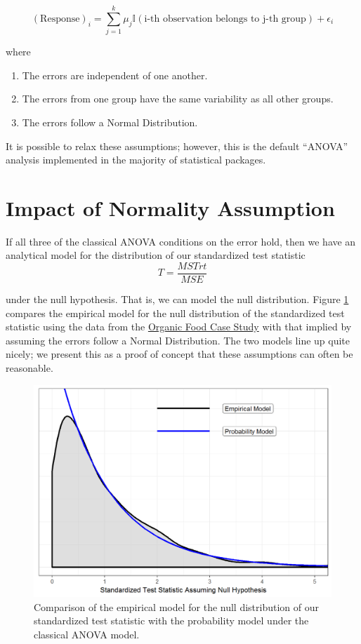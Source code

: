 \documentclass[]{book}
\providecommand{\tightlist}{%
  \setlength{\itemsep}{0pt}\setlength{\parskip}{0pt}}
\theoremstyle{definition}
\theoremstyle{definition}
\theoremstyle{definition}
\theoremstyle{remark}
\begin{document}
\[(\text{Response})_i = \sum_{j=1}^{k} \mu_j \mathbb{I}(\text{i-th observation belongs to j-th group}) + \epsilon_i\]

where

\begin{enumerate}
\def\labelenumi{\arabic{enumi}.}
\tightlist
\item
  The errors are independent of one another.
\item
  The errors from one group have the same variability as all other
  groups.
\item
  The errors follow a Normal Distribution.
\end{enumerate}

It is possible to relax these assumptions; however, this is the default
``ANOVA'' analysis implemented in the majority of statistical packages.

\section{Impact of Normality
Assumption}\label{impact-of-normality-assumption}

If all three of the classical ANOVA conditions on the error hold, then
we have an analytical model for the distribution of our standardized
test statistic \[T = \frac{MSTrt}{MSE}\]

under the null hypothesis. That is, we can model the null distribution.
Figure \ref{fig:anovaclassical-organic-model} compares the empirical
model for the null distribution of the standardized test statistic using
the data from the \protect\hyperlink{CaseOrganic}{Organic Food Case
Study} with that implied by assuming the errors follow a Normal
Distribution. The two models line up quite nicely; we present this as a
proof of concept that these assumptions can often be reasonable.

\begin{figure}

{\centering \includegraphics[width=0.8\linewidth]{./Images/anovaclassical-organic-model-1} 

}

\caption{Comparison of the empirical model for the null distribution of our standardized test statistic with the probability model under the classical ANOVA model.}\label{fig:anovaclassical-organic-model}
\end{figure}
\end{document}
